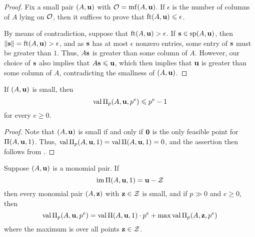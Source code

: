 \documentclass[11pt]{amsart}
\begin{document}
\begin{proof}   Fix a small pair $(A, \mathbf{u})$ with $\mathcal{O} = \operatorname{mf}(A, \mathbf{u})$.  If $\epsilon$ is the number of columns of $A$ lying on $\mathcal{O}$, then it suffices to prove that $\operatorname{ft}(A, \mathbf{u}) \leqslant \epsilon$.

By means of contradiction, suppose that $\operatorname{ft}(A, \mathbf{u}) > \epsilon$.  If $\mathbf{s} \in \operatorname{sp}(A,\mathbf{u})$, then $\| \mathbf{s} \| = \operatorname{ft}(A, \mathbf{u}) > \epsilon$, and as $\mathbf{s}$ has at most $\epsilon$ nonzero entries, some entry of $\mathbf{s}$ must be greater than $1$.  Thus, $A \mathbf{s}$ is greater than some column of $A$.  However, our choice of $\mathbf{s}$ also implies that $A \mathbf{s} \leqslant \mathbf{u}$, which then implies that $\mathbf{u}$ is greater than some column of $A$, contradicting the smallness of $(A, \mathbf{u})$.
\end{proof}

\begin{lemma}
   \label{trivial value bound: L}
   If $(A, \mathbf{u})$ is small, then
   \[ \operatorname{val} \Pi_p(A, \mathbf{u}, p^e) \leqslant p^{e} -1 \]
   for every $e \geq 0$.
\end{lemma}

\begin{proof}
   Note that $(A, \mathbf{u})$ is small if and only if $\mathbf{0}$ is the only feasible point for $\Pi(A, \mathbf{u}, 1)$.
   Thus, $\operatorname{val} \Pi_p(A, \mathbf{u}, 1) = \operatorname{val} \Pi(A, \mathbf{u}, 1) = 0$, and the assertion then follows from .
\end{proof}

\begin{proposition}
   \label{follow-leftovers: P}
   Suppose $(A, \mathbf{u})$ is a monomial pair.
   If
   \[ \operatorname{im} \Pi(A, \mathbf{u}, 1) = \mathbf{u} - \mathcal{Z}\]
   then every monomial pair $(A, \mathbf{z})$ with $\mathbf{z} \in \mathcal{Z}$ is small, and if $p \gg 0$ and $e \geq 0$, then
   \[ \operatorname{val} \Pi_p(A, \mathbf{u}, p^e) = \operatorname{val} \Pi(A, \mathbf{u}, 1) \cdot p^e + \max \operatorname{val} \Pi_p(A, \mathbf{z}, p^e) \]
   where the maximum is over all points $\mathbf{z} \in \mathcal{Z}$.
\end{proposition}

\end{document}
